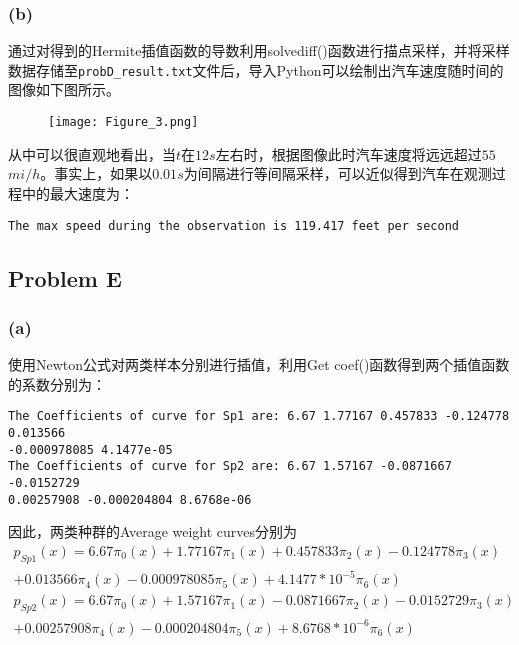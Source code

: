 \documentclass{ctexart}
\begin{document}
\begin{sloppypar}
\subsubsection*{(b)}
通过对得到的Hermite插值函数的导数利用solvediff()函数进行描点采样，并将采样数据存储至\verb|probD_result.txt|文件后，导入Python可以绘制出汽车速度随时间的图像如下图所示。
\begin{figure}[H]
\centering
\texttt{[image: Figure\_3.png]}
\label{Fig3}
\end{figure}
从中可以很直观地看出，当$t$在$12s$左右时，根据图像此时汽车速度将远远超过$55$$mi/h$。事实上，如果以$0.01s$为间隔进行等间隔采样，可以近似得到汽车在观测过程中的最大速度为：
\begin{shaded}
\begin{verbatim}
The max speed during the observation is 119.417 feet per second
\end{verbatim}
\end{shaded}

\subsection*{Problem E}
\subsubsection*{(a)}
使用Newton公式对两类样本分别进行插值，利用Get coef()函数得到两个插值函数的系数分别为：
\begin{shaded}
\begin{verbatim}
The Coefficients of curve for Sp1 are: 6.67 1.77167 0.457833 -0.124778 0.013566
-0.000978085 4.1477e-05 
The Coefficients of curve for Sp2 are: 6.67 1.57167 -0.0871667 -0.0152729
0.00257908 -0.000204804 8.6768e-06 
\end{verbatim}
\end{shaded}
因此，两类种群的Average weight curves分别为
\begin{equation}
\begin{split}
    p_{Sp1}(x) = 6.67\pi_0(x) + 1.77167\pi_1(x) +0.457833\pi_2(x) -0.124778\pi_3(x) \\
    + 0.013566\pi_4(x) -0.000978085\pi_5(x) + 4.1477*10^{-5}\pi_6(x) \\
    p_{Sp2}(x) = 6.67\pi_0(x) + 1.57167\pi_1(x) -0.0871667\pi_2(x)  -0.0152729\pi_3(x) \\
    + 0.00257908\pi_4(x) -0.000204804\pi_5(x) + 8.6768*10^{-6}\pi_6(x)
\end{split}
\end{equation}


\end{sloppypar}
\end{document}
